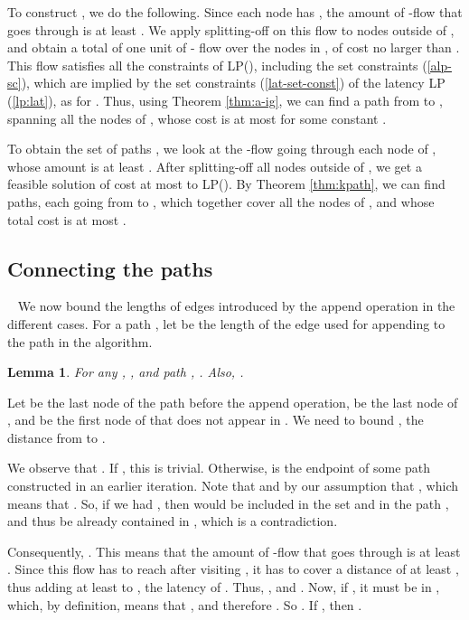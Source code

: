 \documentclass[11pt]{article}
\newcommand{\qed}{\hspace*{\fill}}
\newtheorem{lemma}[theorem]{Lemma}
\newenvironment{proof}[1][Proof. ]{\noindent {\bf #1 }}{\qed}
\begin{document}
To construct , we do the following.
Since each node  has ,  the amount of -flow
that goes through  is at least . We apply splitting-off on this flow to nodes outside of  , and obtain a total of one unit of - flow over the nodes in , of cost no larger than . This flow satisfies all the constraints of LP(), including the set constraints (\ref{alp-sc}), which are implied by the set constraints (\ref{lat-set-const}) of the latency LP (\ref{lp:lat}), as  for .
Thus, using Theorem \ref{thm:a-ig}, we can find a path from  to , spanning
all the nodes of , whose cost is at most  for some constant .

To obtain the set of paths , we look at the -flow going through each node of , whose amount is at least . After splitting-off all nodes outside of , we get a feasible solution of cost at most  to LP(). 
By Theorem \ref{thm:kpath}, we can find 
 paths, each going from  to , which together cover all the nodes of , and whose total cost is at most .

\subsection{Connecting the paths}~
We now bound the lengths of edges introduced by the append operation in the different cases. For a path ,
let  be the length of the edge used for appending  to the path  in the algorithm.

\begin{lemma} \label{lem:app-p}
For any , , and path , . Also, .
\end{lemma}
\begin{proof}
Let  be the last node of the path  before the append operation,  be the last node of , and  be the first node of  that does not appear in . We need to bound , the distance from  to . 

We observe that . If , this is trivial. Otherwise,  is the endpoint of some path constructed in an earlier iteration. Note that   and   by our assumption that , which means that . So, if we had , then  would be included in the set  and in the path , and thus be already contained in , which is a contradiction.

Consequently, . 
This means that the amount of -flow that goes through  is at least . Since this flow has to reach  after visiting , it has to cover a distance of at least , thus adding at least  to , the latency of . Thus, , and . Now, if , it must be in , which, by definition, means that , and therefore . So . If , then .
\end{proof}
\end{document}
